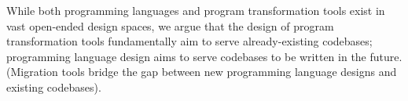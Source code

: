 While both programming languages and program transformation tools exist
in vast open-ended design spaces, we argue that the design of program transformation
tools fundamentally aim to serve already-existing codebases; programming 
language design aims to serve codebases to be written in the future.
(Migration tools bridge the gap between new programming language designs
and existing codebases).

